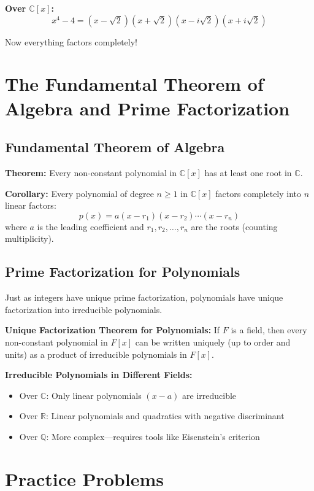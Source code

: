 \documentclass[12pt]{article}
\begin{document}
\textbf{Over $\mathbb{C}[x]$:}
$$x^4 - 4 = (x - \sqrt{2})(x + \sqrt{2})(x - i\sqrt{2})(x + i\sqrt{2})$$

Now everything factors completely!

\section{The Fundamental Theorem of Algebra and Prime Factorization}

\subsection{Fundamental Theorem of Algebra}

\textbf{Theorem:} Every non-constant polynomial in $\mathbb{C}[x]$ has at least one root in $\mathbb{C}$.

\textbf{Corollary:} Every polynomial of degree $n \geq 1$ in $\mathbb{C}[x]$ factors completely into $n$ linear factors:
$$p(x) = a(x - r_1)(x - r_2)\cdots(x - r_n)$$
where $a$ is the leading coefficient and $r_1, r_2, \ldots, r_n$ are the roots (counting multiplicity).

\subsection{Prime Factorization for Polynomials}

Just as integers have unique prime factorization, polynomials have unique factorization into irreducible polynomials.

\textbf{Unique Factorization Theorem for Polynomials:} If $F$ is a field, then every non-constant polynomial in $F[x]$ can be written uniquely (up to order and units) as a product of irreducible polynomials in $F[x]$.

\textbf{Irreducible Polynomials in Different Fields:}
\begin{itemize}
\item Over $\mathbb{C}$: Only linear polynomials $(x - a)$ are irreducible
\item Over $\mathbb{R}$: Linear polynomials and quadratics with negative discriminant
\item Over $\mathbb{Q}$: More complex—requires tools like Eisenstein's criterion
\end{itemize}

\newpage

\section{Practice Problems}
\end{document}
